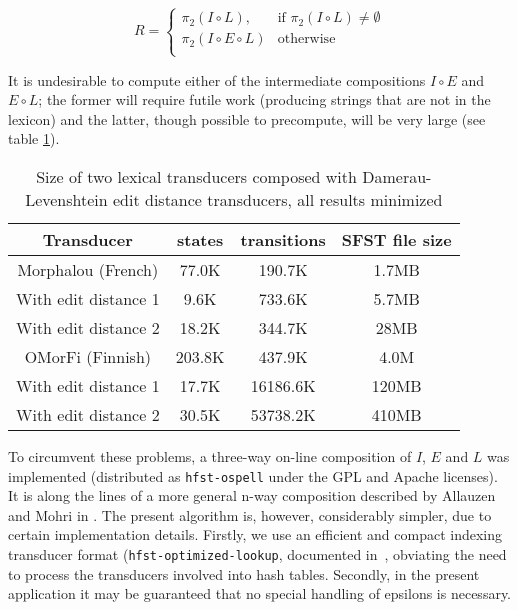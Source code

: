 \documentclass{llncs}
\begin{document}
\begin{equation}
  \label{result_set_eqn}
  R = \begin{cases}
    \pi_2(I \circ L), & \mbox{if } \pi_2(I \circ L) \neq \emptyset \\
    \pi_2(I \circ E \circ L) & \mbox{otherwise}\\
  \end{cases}
\end{equation}

It is undesirable to compute either of the intermediate compositions
$I \circ E$ and $E \circ L$; the former will require futile work (producing
strings that are not in the lexicon) and the latter, though possible to
precompute, will be very large (see table \ref{composed_error_table}).

\begin{table}
  \centering
  \caption{Size of two lexical transducers composed with
    Damerau-Levenshtein edit distance transducers, all results minimized}
  \label{composed_error_table}
  \begin{tabular}{ c c c c }
    \hline
    Transducer               & states   & transitions & SFST file size \\ \hline
    Morphalou (French)       & 77.0K    & 190.7K   & 1.7MB \\
    With edit distance 1     & 9.6K     & 733.6K   & 5.7MB \\
    With edit distance 2     & 18.2K    & 344.7K  & 28MB \\ \hline
    OMorFi (Finnish)         & 203.8K   & 437.9K   & 4.0M \\
    With edit distance 1     & 17.7K    & 16186.6K & 120MB \\
    With edit distance 2     & 30.5K    & 53738.2K & 410MB \\ \hline
  \end{tabular}

\end{table}

To circumvent these problems, a three-way on-line composition of $I$, $E$ and
$L$ was implemented (distributed as \verb!hfst-ospell!
under the GPL and Apache licenses). It is along the lines of a more general
n-way composition described by Allauzen and Mohri in \cite{allauzen/2009}.
The present algorithm is, however, considerably simpler, due to certain
implementation details. Firstly, we use an efficient and compact indexing
transducer format (\verb!hfst-optimized-lookup!, documented
in~\cite{silfverberg/2009/ol}, obviating the
need to process the transducers involved into hash tables. Secondly,
in the present application it may be guaranteed that no special handling
of epsilons is necessary.
\end{document}
